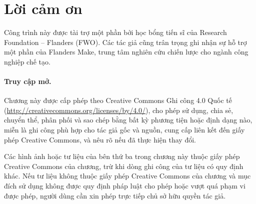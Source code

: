 \section*{Lời cảm ơn}
Công trình này được tài trợ một phần bởi học bổng tiến sĩ của Research Foundation -- Flanders (FWO). Các tác giả cũng trân trọng ghi nhận sự hỗ trợ một phần của Flanders Make, trung tâm nghiên cứu chiến lược cho ngành công nghiệp chế tạo.

\paragraph{Truy cập mở.} Chương này được cấp phép theo Creative Commons Ghi công 4.0 Quốc tế (\url{http://creativecommons.org/licenses/by/4.0/}), cho phép sử dụng, chia sẻ, chuyển thể, phân phối và sao chép bằng bất kỳ phương tiện hoặc định dạng nào, miễn là ghi công phù hợp cho tác giả gốc và nguồn, cung cấp liên kết đến giấy phép Creative Commons, và nêu rõ nếu đã thực hiện thay đổi.

Các hình ảnh hoặc tư liệu của bên thứ ba trong chương này thuộc giấy phép Creative Commons của chương, trừ khi dòng ghi công của tư liệu có quy định khác. Nếu tư liệu không thuộc giấy phép Creative Commons của chương và mục đích sử dụng không được quy định pháp luật cho phép hoặc vượt quá phạm vi được phép, người dùng cần xin phép trực tiếp chủ sở hữu quyền tác giả.
